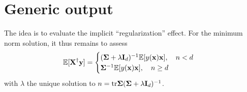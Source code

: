 \documentclass[11pt]{article}
\begin{document}
\section{Generic output}

The idea is to evaluate the implicit ``regularization'' effect. For the minimum norm solution, it thus remains to assess
\begin{equation}\label{eq:implicit-regularization}
  \mathbb E[ \mathbf X^\dagger \mathbf y] = \begin{cases} (\mathbf{\Sigma} + \lambda \mathbf I_d)^{-1} \mathbb E[y(\mathbf x) \mathbf x], \quad n < d \\ \mathbf{\Sigma}^{-1} \mathbb E[y(\mathbf x) \mathbf x], \quad n \ge d \end{cases}
\end{equation}
with $\lambda$ the unique solution to $n = \mathrm{tr} \mathbf{\Sigma} (\mathbf{\Sigma}+ \lambda \mathbf I_d)^{-1}$.


\end{document}
